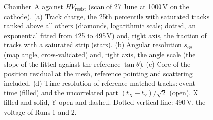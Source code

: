 \begin{figure}[tbp]
  \centering
  \caption{Chamber~A against $HV_\mathrm{resist}$ (scan of 27 June at 1000\,V on the cathode). (a) Track charge, the
  25th percentile with saturated tracks ranked above all others (diamonds, logarithmic scale; dotted, an exponential
  fitted from 425 to 495\,V) and, right axis, the fraction of tracks with a saturated strip (stars). (b) Angular
  resolution $s_{68}$ (map angle, cross-validated) and, right axis, the angle scale (the slope of the fitted against the reference $\tan\theta$).
  (c) Core of the position residual at the mesh, reference pointing and scattering included. (d) Time resolution of
  reference-matched tracks: event time (filled) and the uncorrelated part $(t_X-t_Y)/\sqrt2$ (open). X filled and solid,
  Y open and dashed. Dotted vertical line: 490\,V, the voltage of Runs 1 and 2.}
  \label{fig:gainscan}
\end{figure}
